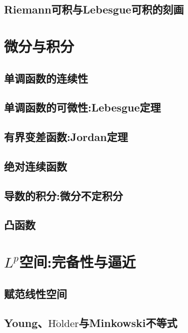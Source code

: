 \documentclass[lang=cn,newtx,10pt,scheme=chinese]{elegantbook}
\begin{document}
\section{Riemann可积与Lebesgue可积的刻画}






\chapter{微分与积分}


\section{单调函数的连续性}

\section{单调函数的可微性:Lebesgue定理}

\section{有界变差函数:Jordan定理}

\section{绝对连续函数}

\section{导数的积分:微分不定积分}

\section{凸函数}






\chapter{$L^p$空间:完备性与逼近}

\section{赋范线性空间}

\section{Young、$\mathrm{H}\ddot{\mathrm{o}}\mathrm{lder}$与Minkowski不等式}
\end{document}
